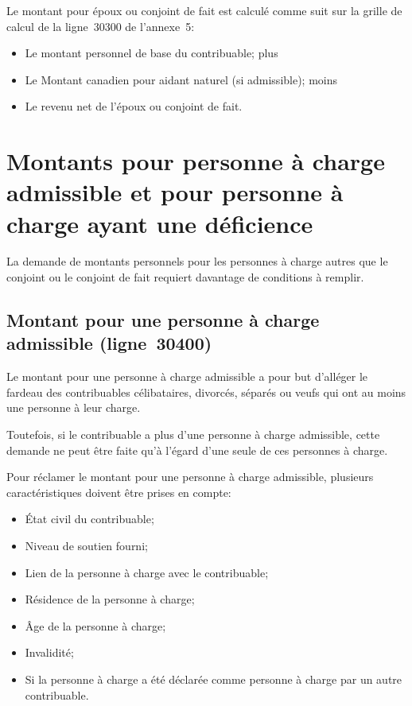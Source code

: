 Le montant pour époux ou conjoint de fait est calculé comme suit sur la grille de calcul de la ligne~30300 de l'annexe~5:
\begin{itemize}
	\item Le montant personnel de base du contribuable; plus
	\item Le Montant canadien pour aidant naturel (si admissible); moins
	\item Le revenu net de l'époux ou conjoint de fait.
\end{itemize}


\section{Montants pour personne à charge admissible et pour personne à charge ayant une déficience}
\begin{intro}
	La demande de montants personnels pour les personnes à charge autres que le conjoint ou le conjoint de fait requiert davantage de conditions à remplir.
\end{intro}


\subsection{Montant pour une personne à charge admissible (ligne~30400)}
Le montant pour une personne à charge admissible a pour but d'alléger le fardeau des contribuables célibataires, divorcés, séparés ou veufs qui ont au moins une personne à leur charge. 

Toutefois, si le contribuable a plus d'une personne à charge admissible, cette demande ne peut être faite qu'à l'égard d'une seule de ces personnes à charge.

Pour réclamer le montant pour une personne à charge admissible, plusieurs caractéristiques doivent être prises en compte:
\begin{itemize}
	\item État civil du contribuable;
	\item Niveau de soutien fourni;
	\item Lien de la personne à charge avec le contribuable;
	\item Résidence de la personne à charge;
	\item Âge de la personne à charge;
	\item Invalidité;
	\item Si la personne à charge a été déclarée comme personne à charge par un autre contribuable.
\end{itemize}

